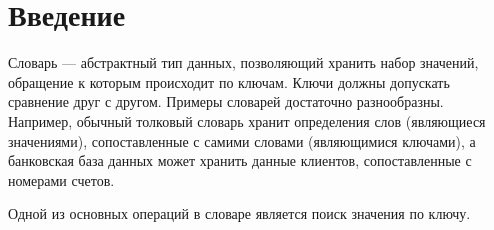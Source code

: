 \chapter*{Введение}

Словарь --- абстрактный тип данных, позволяющий хранить набор значений, обращение к которым происходит по ключам. Ключи должны допускать сравнение друг с другом. Примеры словарей достаточно разнообразны. Например, обычный толковый словарь хранит определения слов (являющиеся значениями), сопоставленные с самими словами (являющимися ключами), а банковская база данных может хранить данные клиентов, сопоставленные с номерами счетов.

Одной из основных операций в словаре является поиск значения по ключу.